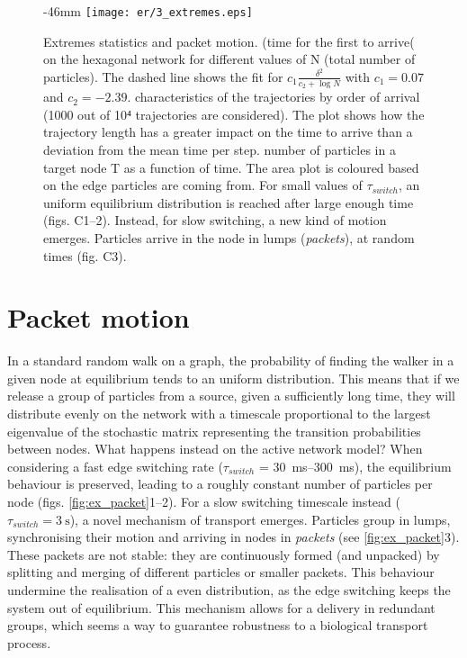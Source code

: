 \begin{figure}
  \begin{adjustwidth*}{}{-46mm}
    \texttt{[image: er/3\_extremes.eps]}%
    {{\label{fig:ex_efpt}}%
    {\label{fig:ex_traj}}%
    {\label{fig:ex_packet}}}%
    \caption{Extremes statistics and packet motion.
    \enspace {} (time for the first to arrive( on the hexagonal network for different values of N (total number of particles). The dashed line shows the fit for $c_1 \frac{\delta^2}{c_2 + \log N}$ with $c_1 = 0.07$ and $c_2 = -2.39$. \enspace characteristics of the trajectories by order of arrival (1000 out of 10⁴ trajectories are considered). The plot shows how the trajectory length has a greater impact on the time to arrive than a deviation from the mean time per step.
    \enspace number of particles in a target node T as a function of time. The area plot is coloured based on the edge particles are coming from. For small values of $\tau_{switch}$, an uniform equilibrium distribution is reached after large enough time (figs. C1--2). Instead, for slow switching, a new kind of motion emerges. Particles arrive in the node in lumps (\emph{packets}), at random times (fig. C3).\label{fig:ex}}
  \end{adjustwidth*}
\end{figure}

\section{Packet motion}

In a standard random walk on a graph, the probability of finding the walker in a given node at equilibrium tends to an uniform distribution. This means that if we release a group of particles from a source, given a sufficiently long time, they will distribute evenly on the network with a timescale proportional to the largest eigenvalue of the stochastic matrix representing the transition probabilities between nodes. What happens instead on the active network model? When considering a fast edge switching rate ($\tau_{switch}$ = \SIrange{30}{300}{\milli\second}), the equilibrium behaviour is preserved, leading to a roughly constant number of particles per node (figs. \ref{fig:ex_packet}1--2). For a slow switching timescale instead ($\tau_{switch} = \SI{3}{\second}$), a novel mechanism of transport emerges. Particles group in lumps, synchronising their motion and arriving in nodes in \emph{packets} (see \cref{fig:ex_packet}3). These packets are not stable: they are continuously formed (and unpacked) by splitting and merging of different particles or smaller packets. This behaviour undermine the realisation of a even distribution, as the edge switching keeps the system out of equilibrium. This mechanism allows for a delivery in redundant groups, which seems a way to guarantee robustness to a biological transport process.
